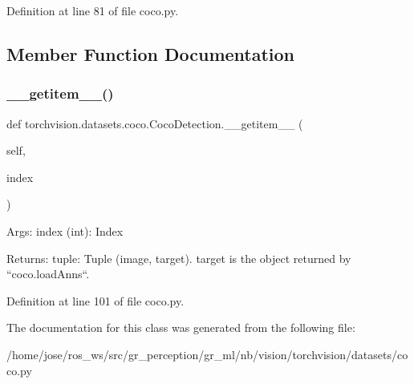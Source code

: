 Definition at line 81 of file coco.\+py.



\subsection{Member Function Documentation}
\mbox{\label{classtorchvision_1_1datasets_1_1coco_1_1CocoDetection_ad857435693ecdbbaf58935b4786f1d4c}} 
\subsubsection{\texorpdfstring{\+\_\+\+\_\+getitem\+\_\+\+\_\+()}{\_\_getitem\_\_()}}
{\footnotesize\ttfamily def torchvision.\+datasets.\+coco.\+Coco\+Detection.\+\_\+\+\_\+getitem\+\_\+\+\_\+ (\begin{DoxyParamCaption}\item[{}]{self,  }\item[{}]{index }\end{DoxyParamCaption})}

\begin{DoxyVerb}Args:
    index (int): Index

Returns:
    tuple: Tuple (image, target). target is the object returned by ``coco.loadAnns``.
\end{DoxyVerb}
 

Definition at line 101 of file coco.\+py.



The documentation for this class was generated from the following file\+:\begin{DoxyCompactItemize}
\item 
/home/jose/ros\+\_\+ws/src/gr\+\_\+perception/gr\+\_\+ml/nb/vision/torchvision/datasets/coco.\+py\end{DoxyCompactItemize}
